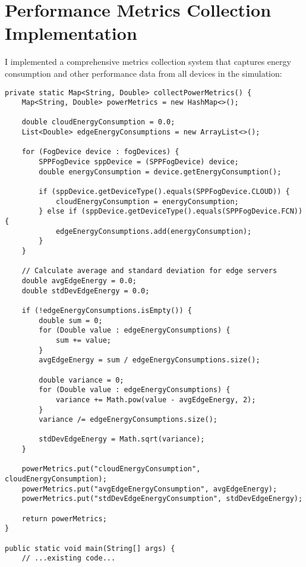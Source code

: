 \chapter{Performance Metrics Collection Implementation}
\label{appendix:metrics-collection}

I implemented a comprehensive metrics collection system that captures energy consumption and other performance data from all devices in the simulation:

\begin{verbatim}
private static Map<String, Double> collectPowerMetrics() {
    Map<String, Double> powerMetrics = new HashMap<>();
    
    double cloudEnergyConsumption = 0.0;
    List<Double> edgeEnergyConsumptions = new ArrayList<>();
    
    for (FogDevice device : fogDevices) {
        SPPFogDevice sppDevice = (SPPFogDevice) device;
        double energyConsumption = device.getEnergyConsumption();
        
        if (sppDevice.getDeviceType().equals(SPPFogDevice.CLOUD)) {
            cloudEnergyConsumption = energyConsumption;
        } else if (sppDevice.getDeviceType().equals(SPPFogDevice.FCN)) {
            edgeEnergyConsumptions.add(energyConsumption);
        }
    }
    
    // Calculate average and standard deviation for edge servers
    double avgEdgeEnergy = 0.0;
    double stdDevEdgeEnergy = 0.0;
    
    if (!edgeEnergyConsumptions.isEmpty()) {
        double sum = 0;
        for (Double value : edgeEnergyConsumptions) {
            sum += value;
        }
        avgEdgeEnergy = sum / edgeEnergyConsumptions.size();
        
        double variance = 0;
        for (Double value : edgeEnergyConsumptions) {
            variance += Math.pow(value - avgEdgeEnergy, 2);
        }
        variance /= edgeEnergyConsumptions.size();
        
        stdDevEdgeEnergy = Math.sqrt(variance);
    }
    
    powerMetrics.put("cloudEnergyConsumption", cloudEnergyConsumption);
    powerMetrics.put("avgEdgeEnergyConsumption", avgEdgeEnergy);
    powerMetrics.put("stdDevEdgeEnergyConsumption", stdDevEdgeEnergy);
    
    return powerMetrics;
}

public static void main(String[] args) {
    // ...existing code...
    

\end{verbatim}
